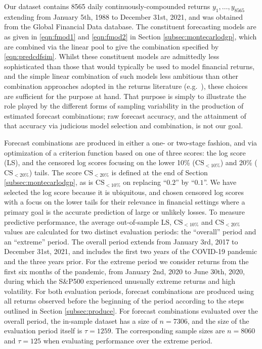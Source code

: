 \documentclass[12pt]{article}
\theoremstyle{definition}
\theoremstyle{remark}
\begin{document}
Our dataset contains 8565 daily continuously-compounded returns $y_{1},\ldots ,y_{8565}$ extending from January 5th, 1988 to December 31st, 2021, and was obtained from the Global Financial Data database. The constituent forecasting models are as given in \eqref{eqn:fmod1} and \eqref{eqn:fmod2} in Section \ref{subsec:montecarlodgp}, which are combined via the linear pool to give the combination specified by \eqref{eqn:predcdfsim}. Whilst these constituent models are admittedly less sophisticated than those that would typically be used to model financial returns, and the simple linear combination of such models less ambitious than other combination approaches adopted in the returns literature (e.g.\ \citealp{Billio2013}), these choices are sufficient for the purpose at hand. That purpose is simply to illustrate the role played by the different forms of sampling variability in the production of estimated forecast combinations; raw forecast accuracy, and the attainment of that accuracy via judicious model selection and combination, is not our goal.

Forecast combinations are produced in either a one- or two-stage fashion, and via optimization of a criterion function based on one of three scores: the log score (LS), and the censored log scores focusing on the lower 10\% ($\mathrm{CS}_{<10\%}$) and 20\% ($\mathrm{CS}_{<20\%}$) tails. The score $\mathrm{CS}_{<20\%}$ is defined at the end of Section \ref{subsec:montecarlodgp}, as is $\mathrm{CS}_{<10\%}$ on replacing ``$0.2$'' by ``$0.1$''. We have selected the log score because it is ubiquitous, and chosen censored log scores with a focus on the lower tails for their relevance in financial settings where a primary goal is the accurate prediction of large or unlikely losses. To measure predictive performance, the average out-of-sample LS, $\mathrm{CS}_{<10\%}$ and $\mathrm{CS}_{<20\%}$ values are calculated for two distinct evaluation periods: the ``overall'' period and an ``extreme'' period. The overall period extends from January 3rd, 2017 to December 31st, 2021, and includes the first two years of the COVID-19 pandemic and the three years prior. For the extreme period we consider returns from the first six months of the pandemic, from January 2nd, 2020 to June 30th, 2020, during which the S\&P500 experienced unusually extreme returns and high volatility. For both evaluation periods, forecast combinations are produced using all returns observed before the beginning of the period according to the steps outlined in Section \ref{subsec:produce}. For forecast combinations evaluated over the overall period, the in-sample dataset has a size of $n=7306$, and the size of the evaluation period itself is $\tau = 1259$. The corresponding sample sizes are $n = 8060$ and $\tau = 125$ when evaluating performance over the extreme period.
\end{document}
